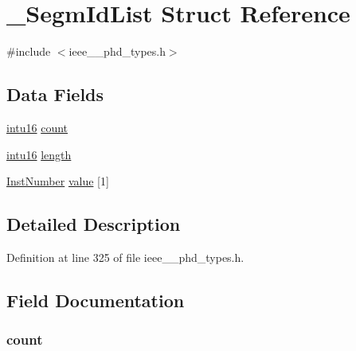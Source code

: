 \hypertarget{struct___segm_id_list}{}\section{\+\_\+\+Segm\+Id\+List Struct Reference}
\label{struct___segm_id_list}


{\ttfamily \#include $<$ieee\+\_\+\_\+phd\+\_\+types.\+h$>$}

\subsection*{Data Fields}
\begin{DoxyCompactItemize}
\item 
\hyperlink{ieee__11073__phd__types_8h_a3561595d2aa7416532e1c9910abd076d}{intu16} \hyperlink{struct___segm_id_list_abf6db060ae8e224764b0f867fb135ecd}{count}
\item 
\hyperlink{ieee__11073__phd__types_8h_a3561595d2aa7416532e1c9910abd076d}{intu16} \hyperlink{struct___segm_id_list_a3743679e4ff85e3e1b3fc2e59973fbb3}{length}
\item 
\hyperlink{ieee__11073__phd__types_8h_ab78fcfd5f6e61b2c8de677df291cc4d7}{Inst\+Number} \hyperlink{struct___segm_id_list_aaf586cbf63af4bade307d577e5e182e9}{value} \mbox{[}1\mbox{]}
\end{DoxyCompactItemize}


\subsection{Detailed Description}


Definition at line 325 of file ieee\+\_\+\_\+phd\+\_\+types.\+h.



\subsection{Field Documentation}
\hypertarget{struct___segm_id_list_abf6db060ae8e224764b0f867fb135ecd}{}
\subsubsection[{count}]{ count}\label{struct___segm_id_list_abf6db060ae8e224764b0f867fb135ecd}


